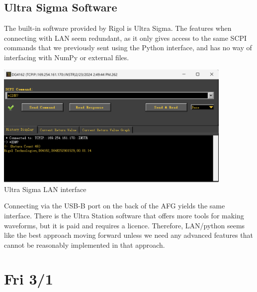 \documentclass{article}
\begin{document}
    \subsection*{Ultra Sigma Software}
    The built-in software provided by Rigol is Ultra Sigma. The features when connecting with LAN seem redundant, as it only gives access to the same SCPI commands that we previously sent using the Python interface, and has no way of interfacing with NumPy or external files.
    \begin{mdframed}[backgroundcolor=gray!20, align = center, userdefinedwidth = 4.8in]
    \includegraphics[width = 4.5in]{img/ultraSigmaInterfaceLAN.png}
    \\Ultra Sigma LAN interface
    \end{mdframed}
    Connecting via the USB-B port on the back of the AFG yields the same interface. There is the Ultra Station software that offers more tools for making waveforms, but it is paid and requires a licence. Therefore, LAN/python seems like the best approach moving forward unless we need any advanced features that cannot be reasonably implemented in that approach.
    \section*{Fri 3/1}
\end{document}
